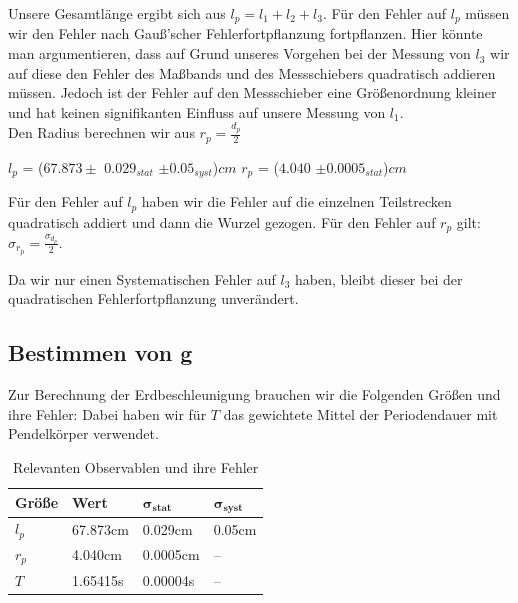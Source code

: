 \documentclass[twoside]{protokoll}
\begin{document}
Unsere Gesamtlänge ergibt sich aus $l_p = l_1 + l_2 + l_3$. Für den Fehler auf $l_p$ müssen wir den Fehler nach Gauß'scher Fehlerfortpflanzung fortpflanzen. 
Hier könnte man argumentieren, dass auf Grund unseres Vorgehen bei der Messung von $l_3$ wir auf diese den Fehler des Maßbands und des Messschiebers quadratisch addieren müssen.
Jedoch ist der Fehler auf den Messschieber eine Größenordnung kleiner und hat keinen signifikanten Einfluss auf unsere Messung von $l_1$.\\
Den Radius berechnen wir aus $r_p = \frac{d_p}{2}$
\begin{center}
$l_p$ = ($67.873 \pm$ $0.029_{stat}$ $\pm 0.05_{syst}$)$cm$   \qquad $r_p$ = ($4.040$ $\pm 0.0005_{stat}$)$cm$
\end{center}

Für den Fehler auf $l_p$ haben wir die Fehler auf die einzelnen Teilstrecken quadratisch addiert und dann die Wurzel gezogen.
Für den Fehler auf $r_p$  gilt: $\sigma_{r_p} =\frac{\sigma_{d_p}}{2}$.

Da wir nur einen Systematischen Fehler auf $l_3$ haben, bleibt dieser bei der quadratischen Fehlerfortpflanzung unverändert.

\subsection{Bestimmen von g}

Zur Berechnung der Erdbeschleunigung brauchen wir die Folgenden Größen und ihre Fehler:
Dabei haben wir für $T$ das gewichtete Mittel der Periodendauer mit Pendelkörper verwendet.
 
\begin{table}[H]
        \centering
        \begin{tabularx}{1.0\textwidth}{X X X X} %
            \toprule
            \textbf{Größe} & \textbf{Wert} & $\mathbf{\sigma_{stat}}$ & $\mathbf{\sigma_{syst}}$ \\
            \midrule
            $l_p$ & 67.873cm & 0.029cm & 0.05cm \\
            $r_p$ & 4.040cm & 0.0005cm & --\\
            $T$ & 1.65415s & 0.00004s & --\\
            \bottomrule
        \end{tabularx}
        \caption{Relevanten Observablen und ihre Fehler}
        \label{tab:längen un fehler}
    \end{table}
    
\end{document}
